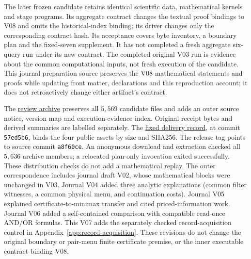 \documentclass[pdflatex,sn-mathphys-num]{sn-jnl}
\theoremstyle{thmstyleone}
\theoremstyle{thmstylethree}
\theoremstyle{thmstyletwo}
\begin{document}
The later frozen candidate retains identical scientific data, mathematical kernels and stage programs. Its aggregate contract changes the textual proof bindings to V08 and omits the historical-index binding; its driver changes only the corresponding contract hash. Its acceptance covers byte inventory, a boundary plan and the fixed-seven supplement. It has not completed a fresh aggregate six-query run under its new contract. The completed original V03 run is evidence about the common computational inputs, not fresh execution of the candidate. This journal-preparation source preserves the V08 mathematical statements and proofs while updating front matter, declarations and this reproduction account; it does not retroactively change either artifact's contract.

The \href{https://github.com/SHiJiE1115/newproj/releases/tag/complete-six-review-20261011-v01}{review archive} preserves all $5,569$ candidate files and adds an outer source notice, version map and execution-evidence index. Original receipt bytes and derived summaries are labelled separately. The \href{https://github.com/SHiJiE1115/newproj/blob/57ed5b69243fec06c2a7a58f062f3793f6557738/theory/complete_six/PUBLIC_DELIVERY_RECEIPT_V01.json}{fixed delivery record}, at commit \texttt{57ed5b6}, binds the four public assets by size and SHA256. The release tag points to source commit \texttt{a8f60ce}. An anonymous download and extraction checked all $5,636$ archive members; a relocated plan-only invocation exited successfully. These distribution checks do not add a mathematical replay. The outer correspondence includes journal draft V02, whose mathematical blocks were unchanged in V03. Journal V04 added three analytic explanations (common filter witnesses, a common physical menu, and continuation costs). Journal V05 explained certificate-to-minimax transfer and cited priced-information work. Journal V06 added a self-contained comparison with compatible read-once AND/OR formulas. This V07 adds the separately checked record-acquisition control in Appendix~\ref{app:record-acquisition}. These revisions do not change the original boundary or pair-menu finite certificate premise, or the inner executable contract binding V08.
\end{document}
